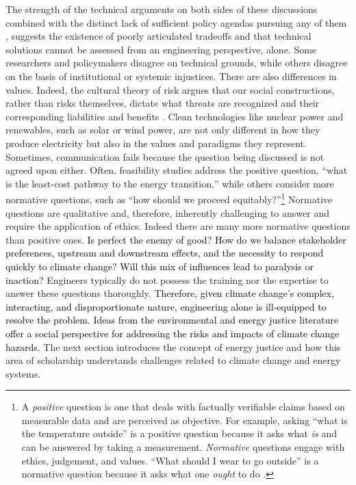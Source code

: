 The strength of the technical arguments on both sides of these discussions
combined with the distinct lack of sufficient policy agendas pursuing any of
them \cite{roelfsema_taking_2020,hale_assessing_2022}, suggests the existence of
poorly articulated tradeoffs and that technical solutions cannot be assessed
from an engineering perspective, alone. Some researchers and policymakers
disagree on technical grounds, while others disagree on the basis of
institutional or systemic injustices. There are also differences in values.
Indeed, the cultural theory of risk argues that our social constructions, rather
than risks themselves, dictate what threats are recognized and their
corresponding liabilities and benefits \cite{mcneeley_cultural_2014,
van_de_graaff_understanding_2016}. Clean technologies like nuclear power and
renewables, such as solar or wind power, are not only different in how they
produce electricity but also in the values and paradigms they represent.
Sometimes, communication fails because the question being discussed is not
agreed upon either. Often, feasibility studies address the positive question,
``what is the least-cost pathway to the energy transition,'' while others
consider more normative questions, such as ``how should we proceed
equitably?''\footnote{ A \textit{positive} question is one that deals with
factually verifiable claims based on measurable data and are perceived as
objective. For example, asking ``what is the temperature outside'' is a positive
question because it asks what \textit{is} and can be answered by taking a
measurement. \textit{Normative} questions engage with ethics, judgement, and
values. ``What should I wear to go outside'' is a normative question because it
asks what one \textit{ought} to do \cite{hands_positive-normative_2012}.}
Normative questions are qualitative and, therefore, inherently challenging to
answer and require the application of ethics. Indeed there are many more
normative questions than positive ones. \textcolor{black}{Is perfect the enemy
of good? How do we balance stakeholder preferences, upstream and downstream
effects, and the necessity to respond quickly to climate change? Will this mix
of influences lead to paralysis or inaction?} Engineers typically do not possess
the training nor the expertise to answer these questions thoroughly.
\textcolor{black}{Therefore, given climate change's complex, interacting, and
disproportionate nature, engineering alone is ill-equipped to resolve the
problem. Ideas from the environmental and energy justice literature offer a
social perspective for addressing the risks and impacts of climate change
hazards.} The next section introduces the concept of energy justice and how this
area of scholarship understands challenges related to climate change and energy
systems.

